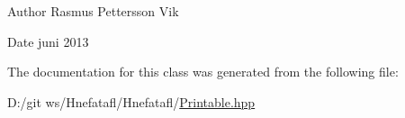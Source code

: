\begin{DoxyAuthor}{Author}
Rasmus Pettersson Vik 
\end{DoxyAuthor}
\begin{DoxyDate}{Date}
juni 2013 
\end{DoxyDate}


The documentation for this class was generated from the following file\-:\begin{DoxyCompactItemize}
\item 
D\-:/git ws/\-Hnefatafl/\-Hnefatafl/\hyperlink{_printable_8hpp}{Printable.\-hpp}\end{DoxyCompactItemize}
